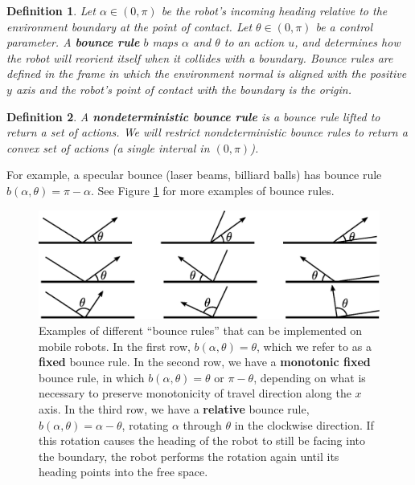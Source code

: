 \documentclass[sageh,times,Review]{sagej}
\newtheorem{definition}{Definition}
\begin{document}
\begin{definition}
Let $\alpha \in (0,\pi)$ be the robot's incoming heading relative to the
environment boundary at the point of contact. Let $\theta \in (0,\pi)$ be a control parameter. A 
\textbf{bounce rule} $b$ maps $\alpha$ and $\theta$ to an action
$u$, and determines how the robot will reorient itself when it collides with a
boundary. Bounce rules are defined in the
frame in which the environment normal is aligned with the positive $y$ axis and the
robot's point of contact with the boundary is the origin.
\end{definition}
\begin{definition}
A \textbf{nondeterministic bounce rule} is a bounce rule lifted to return a set of actions. 
We will restrict nondeterministic bounce rules to
return a convex set of actions (a single interval in $(0, \pi)$).
\end{definition}

For example, a specular bounce (laser beams, billiard balls) has bounce rule 
$b(\alpha, \theta) = \pi - \alpha$. See Figure \ref{fig:bex} for more
examples of bounce rules. 

\begin{figure}
    \includegraphics[width=0.9\columnwidth]{bounce_examples.eps}
    \centering
    \caption[test]{\label{fig:bex}Examples of different ``bounce rules'' that can be implemented on
mobile robots. In the first row, $b(\alpha, \theta) = \theta$, which we refer to
as a \textbf{fixed} bounce rule. In the second row, we have a \textbf{monotonic
fixed} bounce rule, in which
$b(\alpha, \theta) = \theta$ or $\pi-\theta$, depending on what is necessary to
preserve monotonicity of travel direction along the $x$ axis. In the third
row, we have a \textbf{relative} bounce rule, $b(\alpha, \theta) = \alpha - \theta$, rotating $\alpha$ through $\theta$ in the clockwise
direction. If this rotation causes the 
heading of the robot to still be facing into the boundary, the robot 
performs the rotation again until its heading points into the free space.
}
\end{figure}
\end{document}
